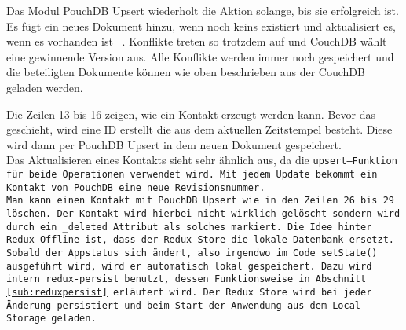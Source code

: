 Das Modul PouchDB Upsert wiederholt die Aktion solange, bis sie erfolgreich ist.
Es fügt ein neues Dokument hinzu, wenn noch keins existiert und aktualisiert es, wenn es vorhanden ist ~\cite{pouch_conflicts}.
Konflikte treten so trotzdem auf und CouchDB wählt eine gewinnende Version aus.
Alle Konflikte werden immer noch gespeichert und die beteiligten Dokumente können wie oben beschrieben aus der CouchDB geladen werden.
%
\begin{center}
  
\end{center}
%
Die Zeilen 13 bis 16 zeigen, wie ein Kontakt erzeugt werden kann. Bevor das geschieht, wird eine ID erstellt die aus dem aktuellen Zeitstempel besteht.
Diese wird dann per PouchDB Upsert in dem neuen Dokument gespeichert.\\
Das Aktualisieren eines Kontakts sieht sehr ähnlich aus, da die \tt{upsert}--Funktion für beide Operationen verwendet wird.
Mit jedem Update bekommt ein Kontakt von PouchDB eine neue Revisionsnummer.\\
Man kann einen Kontakt mit PouchDB Upsert wie in den Zeilen 26 bis 29 löschen.
Der Kontakt wird hierbei nicht wirklich gelöscht sondern wird durch ein \tt{\_deleted} Attribut als solches markiert.
%
%
Die Idee hinter Redux Offline ist, dass der Redux Store die lokale Datenbank ersetzt.
Sobald der \gls{App}status sich ändert, also irgendwo im Code \tt{setState()} ausgeführt wird, wird er automatisch lokal gespeichert.
Dazu wird intern \tt{redux-persist} benutzt, dessen Funktionsweise in Abschnitt \ref{sub:reduxpersist} erläutert wird.
Der Redux Store wird bei jeder Änderung persistiert und beim Start der Anwendung aus dem Local Storage geladen.

